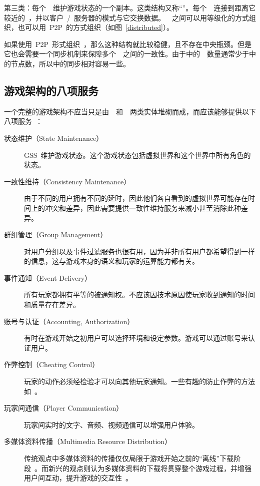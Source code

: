第三类：每个~\gss~维护游戏状态的一个副本。这类结构又称“{\ma}”。每个~\ioc~连接到距离它较近的~\gss，并以客户~\slash~服务器的模式与它交换数据。~\gss~之间可以用等级化的方式组织，也可以用~P2P~的方式组织（如图~\ref{distributed}）。

如果使用~P2P~形式组织~\gss，那么这种结构就比较稳健，且不存在中央瓶颈。但是它也会需要一个同步机制来保障多个~\gss~之间的一致性。由于{\ma}中的~\gss~数量通常少于{\pa}中的节点数，所以{\ma}中的同步相对容易一些。





\subsection{游戏架构的八项服务}
\label{service}

一个完整的游戏架构不应当只是由~\ioc~和~\gss~两类实体堆砌而成，而应该能够提供以下八项服务~\cite{openping, dsl}：

\begin{description}
\item[状态维护（State Maintenance）]
GSS~维护游戏状态。这个游戏状态包括虚拟世界和这个世界中所有角色的状态。

\item[一致性维持（Consistency Maintenance）]
由于不同的用户拥有不同的延时，因此他们各自看到的虚拟世界可能存在时间上的冲突和差异，因此需要提供一致性维持服务来减小甚至消除此种差异。

\item[群组管理（Group Management）]
对用户分组以及事件过滤服务也很有用，因为并非所有用户都希望得到一样的信息，这与游戏本身的语义和玩家的运算能力都有关。

\item[事件通知（Event Delivery）]
所有玩家都拥有平等的被通知权。不应该因技术原因使玩家收到通知的时间和质量存在差异。

\item[账号与认证（Accounting, Authorization）]
有时在游戏开始之初用户可以选择环境和设定参数。游戏可以通过账号来认证用户。

\item[作弊控制（Cheating Control）]
玩家的动作必须经检验才可以向其他玩家通知。一些有趣的防止作弊的方法如~\cite{cheat1, cheat2, cheat3, cheat4}。

\item[玩家间通信（Player Communication）]
玩家间实时的文字、音频、视频通信可以增强用户体验。

\item[多媒体资料传播（Multimedia Resource Distribution）]
传统观点中多媒体资料的传播仅仅局限于游戏开始之前的“离线”下载阶段~\cite{traditional}。而新兴的观点则认为多媒体资料的下载将贯穿整个游戏过程，并增强用户间互动，提升游戏的交互性~\cite{modern1, modern2, modern3}。
\end{description}


